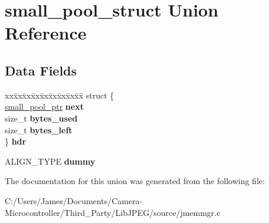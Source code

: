 \hypertarget{unionsmall__pool__struct}{}\section{small\+\_\+pool\+\_\+struct Union Reference}
\label{unionsmall__pool__struct}
\subsection*{Data Fields}
\begin{DoxyCompactItemize}
\item 
\mbox{\label{unionsmall__pool__struct_a7f381b9f5b577a52e4591e3e488771a5}} 
\begin{tabbing}
xx\=xx\=xx\=xx\=xx\=xx\=xx\=xx\=xx\=\kill
struct \{\\
\>\hyperlink{unionsmall__pool__struct}{small\_pool\_ptr} {\bfseries next}\\
\>size\_t {\bfseries bytes\_used}\\
\>size\_t {\bfseries bytes\_left}\\
\} {\bfseries hdr}\\

\end{tabbing}\item 
\mbox{\label{unionsmall__pool__struct_a6767eafa48e1d41f5fd99f7f06258dfe}} 
A\+L\+I\+G\+N\+\_\+\+T\+Y\+PE {\bfseries dummy}
\end{DoxyCompactItemize}


The documentation for this union was generated from the following file\+:\begin{DoxyCompactItemize}
\item 
C\+:/\+Users/\+James/\+Documents/\+Camera-\/\+Microcontroller/\+Third\+\_\+\+Party/\+Lib\+J\+P\+E\+G/source/jmemmgr.\+c\end{DoxyCompactItemize}
